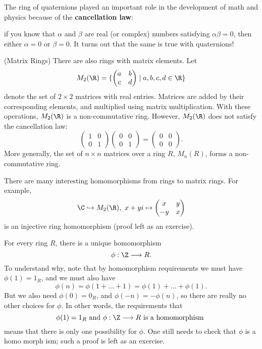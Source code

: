 \documentclass[math1530-lecture-notes]{subfiles}
\begin{document}
The ring of quaternions played an important role in the development of math and physics because of
the \textbf{cancellation law}: \begin{center}
  if you know that $\alpha$ and $\beta$ are real (or complex) numbers satisfying $\alpha\beta=0$,
  then either $ \alpha=0$ or $\beta=0$. It turns out that the same is true with quaternions!
\end{center} 

\begin{example}
  (Matrix Rings) There are also rings with matrix elements. Let \[
    M_2(\R)=\{\begin{pmatrix} a&b\\c&d \end{pmatrix} \mid a,b,c,d\in \R\} 
  \] denote the set of $2\times 2$ matrices with real entries. Matrices are added by their
  corresponding elements, and multiplied using matrix multiplication. With these operations, $
  M_2(\R)$ is a non-commutative ring. However, $ M_2(\R)$ does not satisfy the cancellation law: \[
    \begin{pmatrix} 1&0\\0&1 \end{pmatrix} \begin{pmatrix} 0&0\\0&1 \end{pmatrix} =\begin{pmatrix}
  0&0\\0&0 \end{pmatrix} 
.\] More generally, the set of $n\times n$ matrices over a ring $R$, $M_n(R)$, forms a
non-commutative ring.

There are many interesting homomorphisms from rings to matrix rings. For example, \[
  \C \hookrightarrow M_2(\R),\ x+yi\mapsto \begin{pmatrix} x&y\\-y&x \end{pmatrix}  
\] is an injective ring homomorphism (proof left as an exercise).
\end{example}

\begin{example}
  For every ring $R$, there is a unique homomorphism \[
    \phi:\Z\longrightarrow R
  .\] To understand why, note that by homomorphism requirements we must have $\phi(1)=1_R$, and we
  must also have \[
    \phi(n)=\phi(1+\ldots+1)=\phi(1)+\ldots+\phi(1)
  .\] But we also need $\phi(0)=0_R$, and $\phi(-n)=-\phi(n)$, so there are really no other choices
  for $\phi$. In other words, the requirements that \[
    \phi(1)=1_R ~\text{and}~ \phi:\Z\longrightarrow R ~\text{is a homomorphism}~
  \] means that there is only one possibility for $\phi$. One still needs to check that $ \phi$ is a
  homo morph ism; such a proof is left as an exercise.
\end{example}
\end{document}
